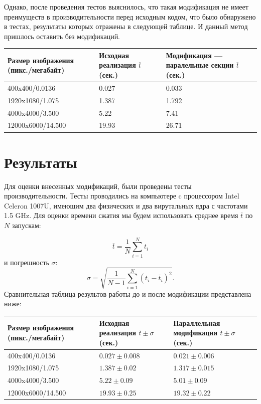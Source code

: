 \documentclass{matmex-diploma-custom}
\begin{document}
Однако, после проведения тестов выяснилось, что такая модификация не имеет преимуществ в производительности перед исходным кодом, что было обнаружено в тестах, результаты которых отражены в следующей таблице. И данный метод пришлось оставить без модификаций.


\begin{center}
    \begin{tabular}{ | p{5cm} | p{5cm} | p{5cm}|}
    \hline
    Размер изображения (пикс./мегабайт) & Исходная реализация $\overline{t}$ (сек.) & Модификация --- паралельные секции $\overline{t}$ (сек.) \\ \hline
    400x400/0.0136 & 0.027 & 0.033 \\ \hline
    1920x1080/1.075 & 1.387 & 1.792 \\ \hline
    4000x4000/3.500 & 5.22 & 7.41 \\ \hline
    12000x6000/14.500 & 19.93 & 26.71 \\ \hline
    \hline
    \end{tabular}
\end{center}

\section{Результаты}
Для оценки внесенных модификаций, были проведены тесты производительности. Тесты  проводились на компьютере c процессором Intel Celeron 1007U, имеющим два физических и два вирутальных ядра с частотами 1.5 GHz. Для оценки времени сжатия мы будем использовать среднее время $\overline{t}$ по $N$ запускам:

$$\overline{t} = \frac{1}{N}\sum\limits_{i=1}^Nt_{i}$$
и погрешность $\sigma$: 
$$\sigma=\sqrt{\frac{1}{N-1}\sum\limits_{i=1}^N(t_{i}-\overline{t}_{i})^2}.$$ 
Сравнительная таблица результов работы до и после модификации представлена ниже:


\begin{center}
    \begin{tabular}{ | p{5cm} | p{5cm} | p{5cm}|}
    \hline
    Размер изображения (пикс./мегабайт) & Исходная реализация $\overline{t}\pm\sigma$ (сек.) & Параллельная модификация $\overline{t}\pm\sigma$ (сек.) \\ \hline
    400x400/0.0136 & $0.027\pm0.008$ & $0.021\pm0.006$ \\ \hline
    1920x1080/1.075 & $1.387\pm0.02$ & $1.317\pm0.015$ \\ \hline
    4000x4000/3.500 & $5.22\pm0.09$ & $5.01\pm0.09$ \\ \hline
    12000x6000/14.500 & $19.93\pm0.25$ & $19.32\pm0.22$ \\ \hline
    \end{tabular}
\end{center}
\end{document}

